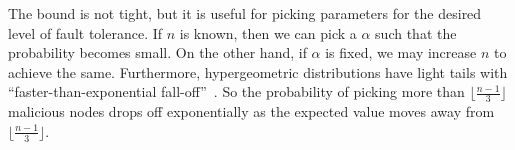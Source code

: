 The bound is not tight, but it is useful for picking parameters for the desired level of fault tolerance.
If $n$ is known, then we can pick a $\alpha$ such that the probability becomes small.
On the other hand, if $\alpha$ is fixed, we may increase $n$ to achieve the same.
Furthermore, hypergeometric distributions have light tails with ``faster-than-exponential fall-off''~\cite{skala2013hypergeometric}.
So the probability of picking more than $\lfloor \frac{n-1}{3} \rfloor$ malicious nodes drops off exponentially as the expected value moves away from $\lfloor \frac{n-1}{3} \rfloor$.






